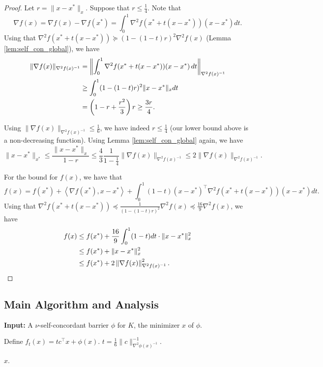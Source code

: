 \begin{proof}
Let $r=\|x-x^{*}\|_{x}$. Suppose that $r\leq\frac{1}{4}$. Note that
\[
\nabla f(x)=\nabla f(x)-\nabla f(x^{*})=\int^{1}_{0}\nabla^{2}f(x^{*}+t(x-x^{*}))(x-x^{*})dt.
\]
Using that $\nabla^{2}f(x^{*}+t(x-x^{*}))\succeq(1-(1-t)r)^{2}\nabla^{2}f(x)$
(Lemma \ref{lem:self_con_global}), we have
\begin{align*}
\|\nabla f(x)\|_{\nabla^{2}f(x)^{-1}} & =\left\Vert \int^{1}_{0}\nabla^{2}f(x^{*}+t(x-x^{*}))(x-x^{*})\,dt\right\Vert_{\nabla^{2}f(x)^{-1}}\\
 & \geq\int^{1}_{0}(1-(1-t)r)^{2}\|x-x^{*}\|_{x}dt\\
 & =\left(1-r+\frac{r^{2}}{3}\right)r\geq\frac{3r}{4}.
\end{align*}

Using $\|\nabla f(x)\|_{\nabla^{2}f(x)^{-1}}\leq\frac{1}{6}$, we
have indeed $r\leq\frac{1}{4}$ (our lower bound above is a non-decreasing
function). Using Lemma \ref{lem:self_con_global} again, we have
\[
\|x-x^{*}\|_{x^{*}}\leq\frac{\|x-x^{*}\|_{x}}{1-r}\leq\frac{4}{3}\frac{1}{1-\frac{1}{4}}\|\nabla f(x)\|_{\nabla^{2}f(x)^{-1}}\leq2\|\nabla f(x)\|_{\nabla^{2}f(x)^{-1}}.
\]

For the bound for $f(x)$, we have that
\[
f(x)=f(x^{*})+\left\langle \nabla f(x^{*}),x-x^{*}\right\rangle +\int^{1}_{0}(1-t)(x-x^{*})^{\top}\nabla^{2}f(x^{*}+t(x-x^{*}))(x-x^{*})dt.
\]
Using that $\nabla^{2}f(x^{*}+t(x-x^{*}))\preceq\frac{1}{(1-(1-t)r)^{2}}\nabla^{2}f(x)\preceq\frac{16}{9}\nabla^{2}f(x)$,
we have
\begin{align*}
f(x) & \leq f(x^{*})+\frac{16}{9}\int^{1}_{0}(1-t)dt\cdot\|x-x^{*}\|^{2}_{x}\\
 & \leq f(x^{*})+\|x-x^{*}\|^{2}_{x}\\
 & \le f(x^{*})+2\left\Vert \nabla f(x)\right\Vert^{2}_{\nabla^{2}f(x)^{-1}}.
\end{align*}
\end{proof}

\subsection{Main Algorithm and Analysis}

\begin{algorithm2e}[H]

\caption{$\mathtt{InteriorPointMethod}$}

\SetAlgoLined

\textbf{Input:} A $\nu$-self-concordant barrier $\phi$ for $K$,
the minimizer $x$ of $\phi$. 

Define $f_{t}(x)=tc^{\top}x+\phi(x)$. $t=\frac{1}{6}\|c\|^{-1}_{\nabla^{2}\phi(x)^{-1}}$.


\Return $x$.

\end{algorithm2e}

